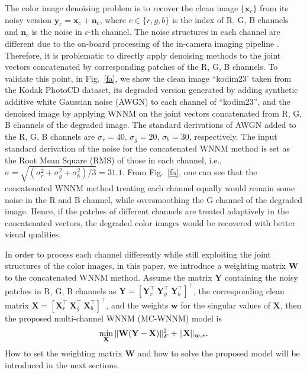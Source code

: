 \documentclass[10pt,twocolumn,letterpaper,sort&compress]{article}
\begin{document}
The color image denoising problem is to recover the clean image $\{\mathbf{x}_{c}\}$ from its noisy version $\mathbf{y}_{c}=\mathbf{x}_{c}+\mathbf{n}_{c}$, where $c\in \{r, g, b\}$ is the index of R, G, B channels and $\mathbf{n}_{c}$ is the noise in $c$-th channel. The noise structures in each channel are different due to the on-board processing of the in-camera imaging pipeline \cite{karaimer_brown_ECCV_2016}. Therefore, it is problematic to directly apply denoising methods to the joint vectors concatenated by corresponding patches of the R, G, B channels. To validate this point, in Fig.\ \ref{fa}, we show the clean image ``kodim23' taken from the Kodak PhotoCD dataset, its degraded version generated by adding synthetic additive white Gaussian noise (AWGN) to each channel of ``kodim23'', and the denoised image by applying WNNM \cite{wnnm} on the joint vectors concatenated from R, G, B channels of the degraded image. The standard derivations of AWGN added to the R, G, B channels are $\sigma_{r}=40$, $\sigma_{g}=20$, $\sigma_{b}=30$, respectively. The input standard derivation of the noise for the concatenated WNNM method is set as the Root Mean Square (RMS) of those in each channel, i.e., $\sigma=\sqrt{(\sigma_{r}^{2}+\sigma_{g}^{2}+\sigma_{b}^{2})/3}=31.1$. From Fig.\ \ref{fa}, one can see that the concatenated WNNM method treating each channel equally would remain some noise in the R and B channel, while oversmoothing the G channel of the degraded image. Hence, if the patches of different channels are treated adaptively in the concatenated vectors, the degraded color images would be recovered with better visual qualities.

In order to process each channel differently while still exploiting the joint structures of the color images, in this paper, we introduce a weighting matrix $\mathbf{W}$ to the concatenated WNNM method. Assume the matrix $\mathbf{Y}$ containing the noisy patches in R, G, B channels as $\mathbf{Y}=[\mathbf{Y}_{r}^{\top}\ \mathbf{Y}_{g}^{\top}\ \mathbf{Y}_{b}^{\top}]^{\top}$, the corresponding clean matrix $\mathbf{X}=[\mathbf{X}_{r}^{\top}\ \mathbf{X}_{g}^{\top}\ \mathbf{X}_{b}^{\top}]^{\top}$, and the weights $\bm{w}$ for the singular values of $\mathbf{X}$, then the proposed multi-channel WNNM (MC-WNNM) model is
\vspace{-1mm}
\begin{equation}
\label{e4}
\vspace{-1mm}
\min_{\mathbf{X}}\|\mathbf{W}(\mathbf{Y}-\mathbf{X})\|_{F}^{2}
+ 
\|\mathbf{X}\|_{\bm{w},*}.
\end{equation}
How to set the weighting matrix $\mathbf{W}$ and how to solve the proposed model will be introduced in the next sections.
\end{document}
